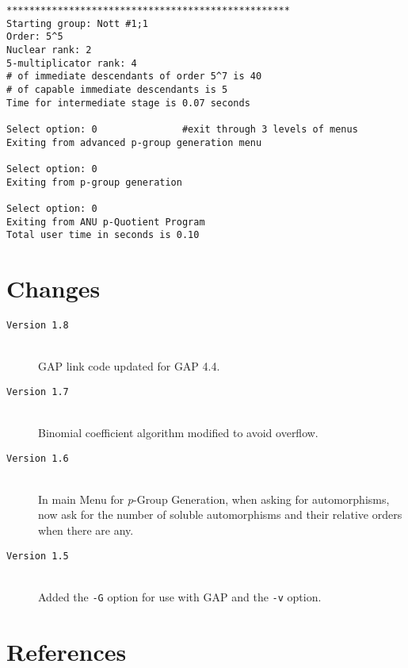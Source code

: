 \documentclass[12pt]{article}
\begin{document}
\begin{verbatim}
**************************************************
Starting group: Nott #1;1
Order: 5^5
Nuclear rank: 2
5-multiplicator rank: 4
# of immediate descendants of order 5^7 is 40
# of capable immediate descendants is 5
Time for intermediate stage is 0.07 seconds

Select option: 0               #exit through 3 levels of menus
Exiting from advanced p-group generation menu

Select option: 0
Exiting from p-group generation

Select option: 0
Exiting from ANU p-Quotient Program
Total user time in seconds is 0.10
\end{verbatim}

\section{Changes}
\begin{description}
  \item[\texttt{Version 1.8}]\ \\
     \textsf{GAP} link code updated for \textsf{GAP} 4.4.
  \item[\texttt{Version 1.7}]\ \\
     Binomial coefficient algorithm modified to avoid overflow.
  \item[\texttt{Version 1.6}]\ \\
     In main Menu for {\it p}-Group Generation, when asking for 
     automorphisms, now ask for the number of soluble automorphisms
     and their relative orders when there are any.
  \item[\texttt{Version 1.5}]\ \\
     Added the \texttt{-G} option for use with \textsf{GAP} and the
     \texttt{-v} option.
\end{description}
\pagebreak
\section*{\centering References}
\end{document}
